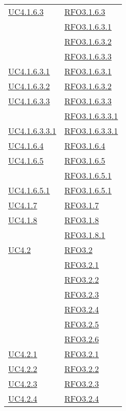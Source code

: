 \begin{longtable}{|>{\centering}m{5cm}|m{5cm}<{\centering}|}
\hyperref[UC4.1.6.3]{UC4.1.6.3} & \hyperlink{RFO3.1.6.3}{RFO3.1.6.3}\\
& \hyperlink{RFO3.1.6.3.1}{RFO3.1.6.3.1}\\
& \hyperlink{RFO3.1.6.3.2}{RFO3.1.6.3.2}\\
& \hyperlink{RFO3.1.6.3.3}{RFO3.1.6.3.3}\\ \hline
\hyperref[UC4.1.6.3.1]{UC4.1.6.3.1} & \hyperlink{RFO3.1.6.3.1}{RFO3.1.6.3.1}\\ \hline
\hyperref[UC4.1.6.3.2]{UC4.1.6.3.2} & \hyperlink{RFO3.1.6.3.2}{RFO3.1.6.3.2}\\ \hline
\hyperref[UC4.1.6.3.3]{UC4.1.6.3.3} & \hyperlink{RFO3.1.6.3.3}{RFO3.1.6.3.3}\\
& \hyperlink{RFO3.1.6.3.3.1}{RFO3.1.6.3.3.1}\\ \hline
\hyperref[UC4.1.6.3.3.1]{UC4.1.6.3.3.1} & \hyperlink{RFO3.1.6.3.3.1}{RFO3.1.6.3.3.1}\\ \hline
\hyperref[UC4.1.6.4]{UC4.1.6.4} & \hyperlink{RFO3.1.6.4}{RFO3.1.6.4}\\ \hline
\hyperref[UC4.1.6.5]{UC4.1.6.5} & \hyperlink{RFO3.1.6.5}{RFO3.1.6.5}\\
& \hyperlink{RFO3.1.6.5.1}{RFO3.1.6.5.1}\\ \hline
\hyperref[UC4.1.6.5.1]{UC4.1.6.5.1} & \hyperlink{RFO3.1.6.5.1}{RFO3.1.6.5.1}\\ \hline
\hyperref[UC4.1.7]{UC4.1.7} & \hyperlink{RFO3.1.7}{RFO3.1.7}\\ \hline
\hyperref[UC4.1.8]{UC4.1.8} & \hyperlink{RFO3.1.8}{RFO3.1.8}\\
& \hyperlink{RFO3.1.8.1}{RFO3.1.8.1}\\ \hline
\hyperref[UC4.2]{UC4.2} & \hyperlink{RFO3.2}{RFO3.2}\\
& \hyperlink{RFO3.2.1}{RFO3.2.1}\\
& \hyperlink{RFO3.2.2}{RFO3.2.2}\\
& \hyperlink{RFO3.2.3}{RFO3.2.3}\\
& \hyperlink{RFO3.2.4}{RFO3.2.4}\\
& \hyperlink{RFO3.2.5}{RFO3.2.5}\\
& \hyperlink{RFO3.2.6}{RFO3.2.6}\\ \hline
\hyperref[UC4.2.1]{UC4.2.1} & \hyperlink{RFO3.2.1}{RFO3.2.1}\\ \hline
\hyperref[UC4.2.2]{UC4.2.2} & \hyperlink{RFO3.2.2}{RFO3.2.2}\\ \hline
\hyperref[UC4.2.3]{UC4.2.3} & \hyperlink{RFO3.2.3}{RFO3.2.3}\\ \hline
\hyperref[UC4.2.4]{UC4.2.4} & \hyperlink{RFO3.2.4}{RFO3.2.4}\\ \hline

\end{longtable}
